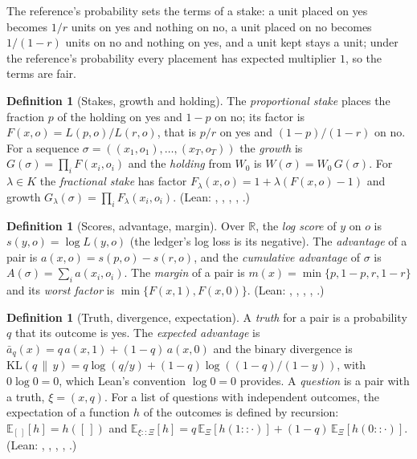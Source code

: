 \documentclass[11pt]{article}
\theoremstyle{plain}
\theoremstyle{definition}
\newtheorem{definition}[theorem]{Definition}
\theoremstyle{remark}
\newcommand{\KL}[2]{\mathrm{KL}(#1\,\|\,#2)}
\newcommand{\E}{\mathbb{E}}
\newcommand{\R}{\mathbb{R}}
\newcommand{\abar}{\bar a}
\begin{document}
The reference's probability sets the terms of a stake: a unit placed on yes becomes $1/r$ units on
yes and nothing on no, a unit placed on no becomes $1/(1-r)$ units on no and nothing on yes, and a
unit kept stays a unit; under the reference's probability every placement has expected multiplier
$1$, so the terms are fair.

\begin{definition}[Stakes, growth and holding]
\label{def:stake}
The \emph{proportional stake} places the fraction $p$ of the holding on yes and $1-p$ on no; its
factor is $F(x,o)=L(p,o)/L(r,o)$, that is $p/r$ on yes and $(1-p)/(1-r)$ on no. For a sequence
$\sigma=((x_1,o_1),\dots,(x_T,o_T))$ the \emph{growth} is $G(\sigma)=\prod_{i}F(x_i,o_i)$ and the
\emph{holding} from $W_0$ is $W(\sigma)=W_0\,G(\sigma)$. For $\lambda\in K$ the \emph{fractional
stake} has factor $F_\lambda(x,o)=1+\lambda(F(x,o)-1)$ and growth
$G_\lambda(\sigma)=\prod_iF_\lambda(x_i,o_i)$. (Lean: , , ,
, .)
\end{definition}

\begin{definition}[Scores, advantage, margin]
Over $\R$, the \emph{log score} of $y$ on $o$ is $s(y,o)=\log L(y,o)$ (the ledger's log loss is its
negative). The \emph{advantage} of a pair is $a(x,o)=s(p,o)-s(r,o)$, and the \emph{cumulative
advantage} of $\sigma$ is $A(\sigma)=\sum_ia(x_i,o_i)$. The \emph{margin} of a pair is
$m(x)=\min\{p,1-p,r,1-r\}$ and its \emph{worst factor} is $\min\{F(x,1),F(x,0)\}$. (Lean:
, , , , .)
\end{definition}

\begin{definition}[Truth, divergence, expectation]
A \emph{truth} for a pair is a probability $q$ that its outcome is yes. The \emph{expected
advantage} is $\abar_q(x)=q\,a(x,1)+(1-q)\,a(x,0)$ and the binary divergence is
$\KL{q}{y}=q\log(q/y)+(1-q)\log((1-q)/(1-y))$, with $0\log0=0$, which Lean's convention $\log0=0$
provides. A \emph{question} is a pair with a truth, $\xi=(x,q)$. For a list of questions with
independent outcomes, the expectation of a function $h$ of the outcomes is defined by recursion:
$\E_{[\,]}[h]=h([\,])$ and $\E_{\xi::\Xi}[h]=q\,\E_{\Xi}[h(1::\cdot)]+(1-q)\,\E_{\Xi}[h(0::\cdot)]$.
(Lean: , , , ,
.)
\end{definition}
\end{document}

